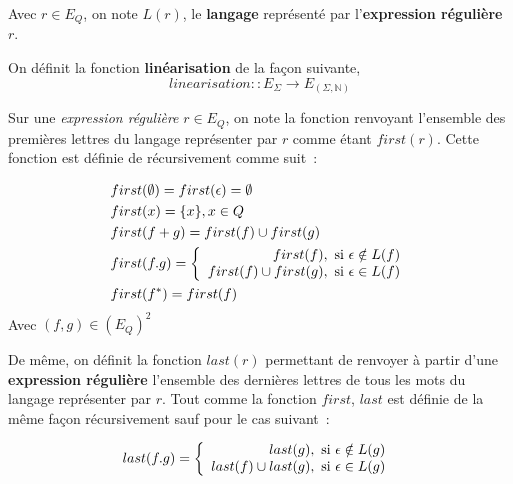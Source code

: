 \begin{Definition}
  Avec \(r \in E_{Q}\), on note \(L(r)\), le \textbf{langage} représenté par 
  l'\textbf{expression régulière} \(r\).
\end{Definition}

\begin{Definition}
  On définit la fonction \textbf{linéarisation} de la façon suivante,
  \[
    linearisation :: E_{\Sigma} \to E_{(\Sigma, \mathbb{N})}
  \]
\end{Definition}

\begin{Definition}
  Sur une \textit{expression régulière} \(r \in E_{Q}\), on note la fonction 
  renvoyant l'ensemble des premières lettres du langage représenter par \(r\) 
  comme étant \(first(r)\). Cette fonction est définie de récursivement comme 
  suit~:

  \begin{equation*}
    \begin{split}
    & first(\emptyset) = first(\epsilon) = \emptyset\\
    & first(x) = \{x\}, x \in Q\\
    & first(f + g) = first(f) \cup first(g)\\
    & first(f.g) = \left \{
      \begin{array}{r c l}
        first(f), \text{ si } \epsilon \notin L(f)\\
        first(f) \cup first(g), \text{ si } \epsilon \in L(f)\\
      \end{array}
      \right . \\
    & first(f^*) = first(f)
    \end{split}
  \end{equation*}
  Avec \((f,g) \in (E_{Q})^2\)
\end{Definition}

\begin{Definition}
  De même, on définit la fonction \(last(r)\) permettant de renvoyer à partir 
  d'une \textbf{expression régulière} l'ensemble des dernières lettres de tous 
  les mots du langage représenter par \(r\).
  Tout comme la fonction \(first\), \(last\) est définie de la même façon 
  récursivement sauf pour le cas suivant~:

  \[
    last(f.g) = \left \{
      \begin{array}{r c l}
        last(g), \text{ si } \epsilon \notin L(g)\\
        last(f) \cup last(g), \text{ si } \epsilon \in L(g)\\
      \end{array}
      \right . \\
  \]
\end{Definition}

